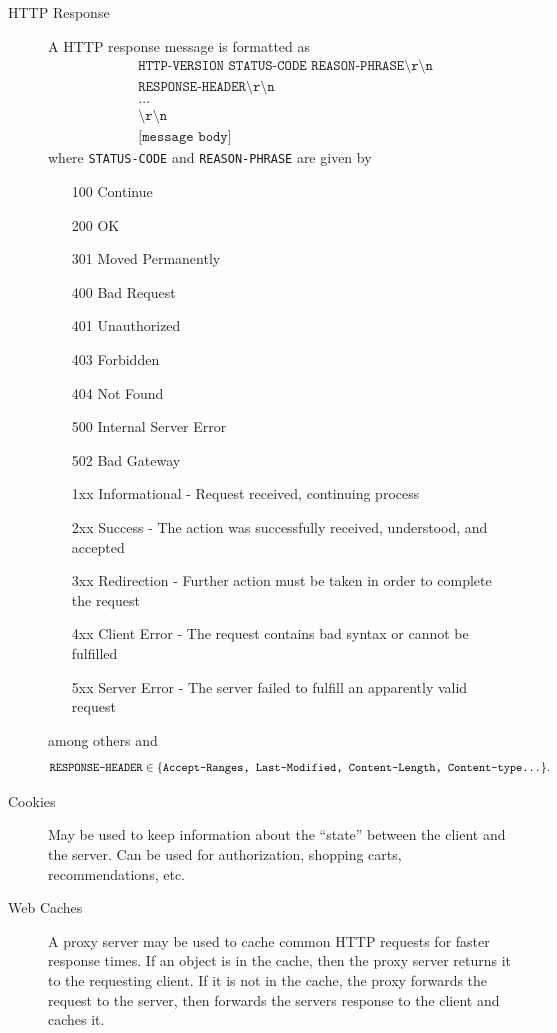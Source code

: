 \documentclass{article}
\begin{document}
\begin{description}
        \item[HTTP Response]
    A HTTP response message is formatted as
    \begin{align*}
        &\texttt{HTTP-VERSION STATUS-CODE REASON-PHRASE\textbackslash r\textbackslash n}\\
        &\texttt{RESPONSE-HEADER\textbackslash r\textbackslash n}\\
        &\dots\\
        &\texttt{\textbackslash r\textbackslash n}\\
        &\texttt{[message body]}
    \end{align*}
    where \texttt{STATUS-CODE} and \texttt{REASON-PHRASE} are given by
    \begin{enumerate}
        \item[100] Continue
        \item[200] OK
        \item[301] Moved Permanently
        \item[400] Bad Request
        \item[401] Unauthorized
        \item[403] Forbidden
        \item[404] Not Found
        \item[500] Internal Server Error
        \item[502] Bad Gateway
    
        \item[1xx] Informational - Request received, continuing process
        \item[2xx] Success - The action was successfully received, understood, and accepted
        \item[3xx] Redirection - Further action must be taken in order to complete the request
        \item[4xx] Client Error - The request contains bad syntax or cannot be fulfilled
        \item[5xx] Server Error - The server failed to fulfill an apparently valid request
    \end{enumerate}
    among others and 
    \[
        \texttt{RESPONSE-HEADER}\in\{\texttt{Accept-Ranges, Last-Modified, Content-Length, Content-type\dots}\}.
    \]
    
    \item[Cookies] May be used to keep information about the ``state'' between the client and the 
    server. Can be used for authorization, shopping carts, recommendations, etc.
    
    \item[Web Caches] A proxy server may be used to cache common HTTP requests for faster response 
    times. If an object is in the cache, then the proxy server returns it to the requesting client.
    If it is not in the cache, the proxy forwards the request to the server, then forwards the 
    servers response to the client and caches it.
\end{description}
\end{document}
